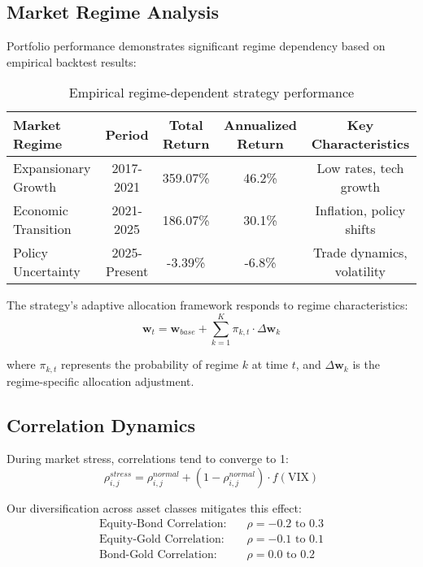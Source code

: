 \documentclass[onecolumn,ieee]{arithmaxresearch}
\begin{document}
\subsection{Market Regime Analysis}

Portfolio performance demonstrates significant regime dependency based on empirical backtest results:

\begin{table}[h]
\centering
\begin{tabular}{lcccc}
\toprule
Market Regime & Period & Total Return & Annualized Return & Key Characteristics \\
\midrule
Expansionary Growth & 2017-2021 & 359.07\% & 46.2\% & Low rates, tech growth \\
Economic Transition & 2021-2025 & 186.07\% & 30.1\% & Inflation, policy shifts \\
Policy Uncertainty & 2025-Present & -3.39\% & -6.8\% & Trade dynamics, volatility \\
\bottomrule
\end{tabular}
\caption{Empirical regime-dependent strategy performance}
\end{table}

The strategy's adaptive allocation framework responds to regime characteristics:
\begin{equation}
\mathbf{w}_t = \mathbf{w}_{base} + \sum_{k=1}^K \pi_{k,t} \cdot \Delta\mathbf{w}_k
\end{equation}

where $\pi_{k,t}$ represents the probability of regime $k$ at time $t$, and $\Delta\mathbf{w}_k$ is the regime-specific allocation adjustment.

\subsection{Correlation Dynamics}

During market stress, correlations tend to converge to 1:
\begin{equation}
\rho_{i,j}^{stress} = \rho_{i,j}^{normal} + (1 - \rho_{i,j}^{normal}) \cdot f(\text{VIX})
\end{equation}

Our diversification across asset classes mitigates this effect:
\begin{align}
\text{Equity-Bond Correlation:} &\quad \rho = -0.2 \text{ to } 0.3 \\
\text{Equity-Gold Correlation:} &\quad \rho = -0.1 \text{ to } 0.1 \\
\text{Bond-Gold Correlation:} &\quad \rho = 0.0 \text{ to } 0.2
\end{align}
\end{document}
